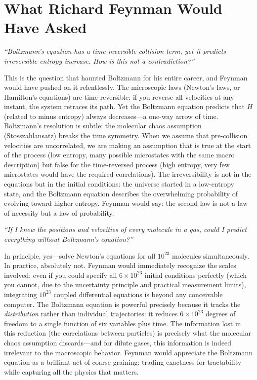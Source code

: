\section*{What Richard Feynman Would Have Asked}

\textit{``Boltzmann's equation has a time-reversible collision term, yet it predicts irreversible entropy increase. How is this not a contradiction?''}

This is the question that haunted Boltzmann for his entire career, and Feynman would have pushed on it relentlessly. The microscopic laws (Newton's laws, or Hamilton's equations) are time-reversible: if you reverse all velocities at any instant, the system retraces its path. Yet the Boltzmann equation predicts that $H$ (related to minus entropy) always decreases---a one-way arrow of time. Boltzmann's resolution is subtle: the molecular chaos assumption (Stosszahlansatz) breaks the time symmetry. When we assume that pre-collision velocities are uncorrelated, we are making an assumption that is true at the start of the process (low entropy, many possible microstates with the same macro description) but false for the time-reversed process (high entropy, very few microstates would have the required correlations). The irreversibility is not in the equations but in the initial conditions: the universe started in a low-entropy state, and the Boltzmann equation describes the overwhelming probability of evolving toward higher entropy. Feynman would say: the second law is not a law of necessity but a law of probability.

\textit{``If I knew the positions and velocities of every molecule in a gas, could I predict everything without Boltzmann's equation?''}

In principle, yes---solve Newton's equations for all $10^{23}$ molecules simultaneously. In practice, absolutely not. Feynman would immediately recognize the scales involved: even if you could specify all $6\times 10^{23}$ initial conditions perfectly (which you cannot, due to the uncertainty principle and practical measurement limits), integrating $10^{23}$ coupled differential equations is beyond any conceivable computer. The Boltzmann equation is powerful precisely because it tracks the \emph{distribution} rather than individual trajectories: it reduces $6\times 10^{23}$ degrees of freedom to a single function of six variables plus time. The information lost in this reduction (the correlations between particles) is precisely what the molecular chaos assumption discards---and for dilute gases, this information is indeed irrelevant to the macroscopic behavior. Feynman would appreciate the Boltzmann equation as a brilliant act of coarse-graining: trading exactness for tractability while capturing all the physics that matters.

